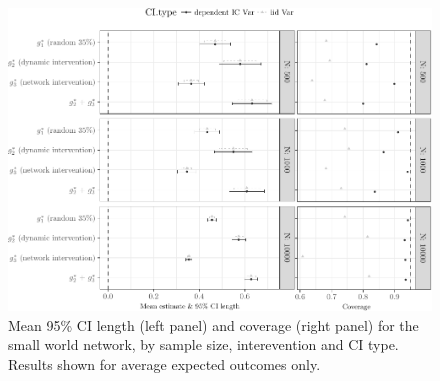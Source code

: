 \documentclass[english]{article}\usepackage[]{graphicx}\usepackage[]{color}
\makeatletter
\def\maxwidth{ %
  \ifdim\Gin@nat@width>\linewidth
    \linewidth
  \else
    \Gin@nat@width
  \fi
}
\newenvironment{knitrout}{}{} %
\theoremstyle{plain}
\theoremstyle{plain}
\makeatother
\begin{document}
\begin{knitrout}\footnotesize
{}\color{fgcolor}\begin{figure}

{\centering \includegraphics[width=\maxwidth]{TablesFigs/knitR-CIres_EY_smwld_bw-1} 

}

\caption[Mean 95\% CI length (left panel) and coverage (right panel) for the small world network, by sample size, interevention and CI type]{Mean 95\% CI length (left panel) and coverage (right panel) for the small world network, by sample size, interevention and CI type. Results shown for average expected outcomes only.}\label{fig:CIres.EY.smwld.bw}
\end{figure}


\end{knitrout}
\end{document}
